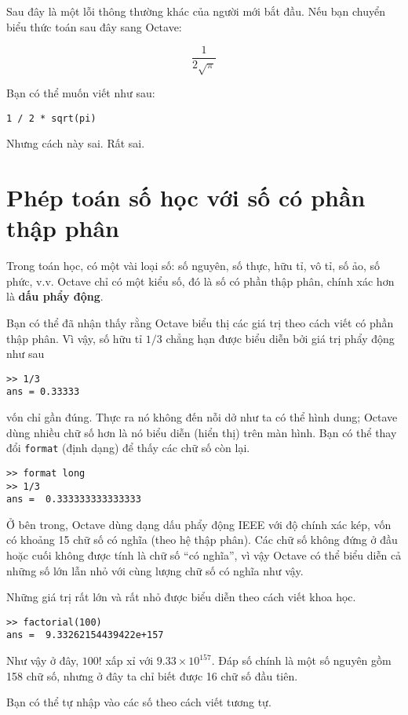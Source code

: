 \documentclass[12pt]{book}
\begin{document}
Sau đây là một lỗi thông thường khác của người mới bắt đầu. Nếu bạn 
chuyển biểu thức toán sau đây sang Octave:

\[ \frac{1}{2 \sqrt \pi}\]

Bạn có thể muốn viết như sau:

\begin{verbatim}
1 / 2 * sqrt(pi)
\end{verbatim}
%
Nhưng cách này sai. Rất sai.


\section{Phép toán số học với số có phần thập phân}

Trong toán học, có một vài loại số: số nguyên, số thực, hữu tỉ, vô tỉ,
số ảo, số phức, v.v. Octave chỉ có một kiểu số, đó là số có phần
thập phân, chính xác hơn là {\bf dấu phẩy động}.

Bạn có thể đã nhận thấy rằng Octave biểu thị các giá trị theo cách
viết có phần thập phân. Vì vậy, số hữu tỉ $1/3$ chẳng hạn được biểu
diễn bởi giá trị phẩy động như sau

\begin{verbatim}
>> 1/3
ans = 0.33333
\end{verbatim}
%
\noindent vốn chỉ gần đúng. Thực ra nó không đến nỗi dở như ta
có thể hình dung; Octave dùng nhiều chữ số hơn là nó biểu
diễn (hiển thị) trên màn hình. Bạn có thể thay đổi {\tt format} 
(định dạng) để thấy các chữ số còn lại.

\begin{verbatim}
>> format long
>> 1/3
ans =  0.333333333333333
\end{verbatim}
%
Ở bên trong, Octave dùng dạng dấu phẩy động IEEE với độ
chính xác kép, vốn có khoảng 15 chữ số có nghĩa (theo hệ thập
phân). Các chữ số không đứng ở đầu hoặc cuối không được
tính là chữ số ``có nghĩa'', vì vậy Octave có thể biểu diễn cả
những số lớn lẫn nhỏ với cùng lượng chữ số có nghĩa như vậy.

Những giá trị rất lớn và rất nhỏ được biểu diễn theo cách viết
khoa học.

\begin{verbatim}
>> factorial(100)
ans =  9.33262154439422e+157
\end{verbatim}
%
Như vậy ở đây, 
$100!$ xấp xỉ với $9.33 \times 10^{157}$.  Đáp số chính là một 
số nguyên gồm 158 chữ số, nhưng ở đây ta chỉ biết được 16
chữ số đầu tiên.

Bạn có thể tự nhập vào các số theo cách viết tương tự.
\end{document}
